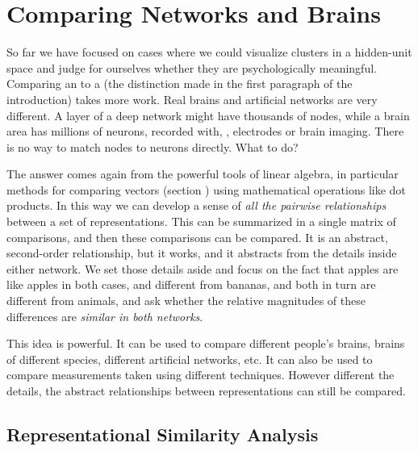 \section{Comparing Networks and Brains}\label{compareNetsBrains}

So far we have focused on cases where we could visualize clusters in a hidden-unit space and judge for ourselves whether they are psychologically meaningful. Comparing an  to a  (the distinction made in the first paragraph of the introduction) takes more work. Real brains and artificial networks are very different. A layer of a deep network might have thousands of nodes, while a brain area has millions of neurons, recorded with, \eg, electrodes or brain imaging. There is no way to match nodes to neurons directly. What to do?

The answer comes again from the powerful tools of linear algebra, in particular methods for comparing vectors (section ) using mathematical operations like dot products. In this way we can develop a sense of \emph{all the pairwise relationships} between a set of representations. This can be summarized in a single matrix of comparisons, and then these comparisons can be compared.  It is an abstract, second-order relationship, but it works, and it abstracts from the details inside either network. We set those details aside and focus on the fact that apples are like apples in both cases, and different from bananas, and both in turn are different from animals, and ask whether the relative magnitudes of these differences are \emph{similar in both networks}. 

This idea is powerful. It can be used to compare different people's brains, brains of different species, different artificial networks, etc. It can also be used to compare measurements taken using different techniques. However different the details, the abstract relationships between representations can still be compared.

\subsection{Representational Similarity Analysis}\label{rsa}

